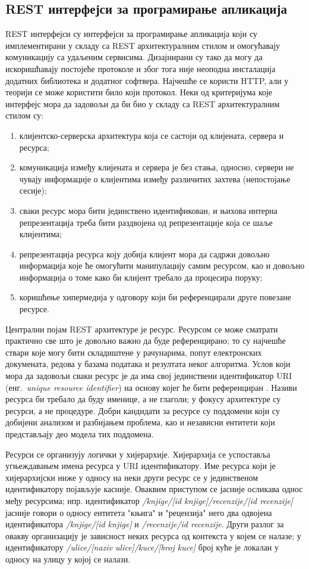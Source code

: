 \documentclass[12pt,oneside]{memoir}
\begin{document}
\subsection{REST интерфејси за програмирање апликација}
REST интерфејси су интерфејси за програмирање апликација који су имплементирани у складу са REST архитектуралним стилом и омогућавају комуникацију са удаљеним сервисима. Дизајнирани су тако да могу да искоришћавају постојеће протоколе и због тога није неоподна инсталација додатних библиотека и додатног софтвера. Најчешће се користи HTTP, али у теорији се може користити било који протокол. Неки од критеријума које интерфејс мора да задовољи да би био у складу са REST архитектуралним стилом су:
\begin{enumerate}
\item клијентско-серверска архитектура која се састоји од клијената, сервера и ресурса;
\item комуникација између клијената и сервера је без стања, односно, сервери не чувају информације о клијентима између различитих захтева (непостојање сесије);
\item сваки ресурс мора бити јединствено идентификован, и њихова интерна репрезентација треба бити раздвојена од репрезентације која се шаље клијентима;
\item репрезентација ресурса коју добија клијент мора да садржи довољно информација које ће омогућити манипулацију самим ресурсом, као и довољно информација о томе како би клијент требало да процесира поруку;
\item коришћење хипермедија у одговору који би референцирали друге повезане ресурсе.
\end{enumerate}
Централни појам REST архитектуре је ресурс. Ресурсом се може сматрати практично све што је довољно важно да буде референцирано; то су најчешће ствари које могу бити складиштене у рачунарима, попут електронских докумената, редова у базама података и резултата неког алгоритма. Услов који мора да задовољи сваки ресурс је да има свој јединствени идентификатор URI (енг.~\textit{unique resource identifier}) на основу којег ће бити референциран \cite{RESTfulWebAPIs}. Називи ресурса би требало да буду именице, а не глаголи; у фокусу архитектуре су ресурси, а не процедуре. Добри кандидати за ресурсе су поддомени који су добијени анализом и разбијањем проблема, као и независни ентитети који представљају део модела тих поддомена.

Ресурси се организују логички у хијерархије. Хијерархија се успоставља угњеждавањем имена ресурса у URI идентификатору. Име ресурса који је хијерархијски ниже у односу на неки други ресурс се у јединственом идентификатору појављује касније. Оваквим приступом се јасније осликава однос међу ресурсима; нпр. идентификатор \textit{/knjige/[id knjige]/recenzije/[id recenzije]} јасније говори о односу ентитета "књига" и "рецензија" него два одвојена идентификатора \textit{/knjige/[id knjige]} и \textit{/recenzije/id recenzije}. Други разлог за овакву организацију је зависност неких ресурса од контекста у којем се налазе; у идентификатору \textit{/ulice/[naziv ulice]/kuce/[broj kuce]} број куће је локалан у односу на улицу у којој се налази.
\end{document}
